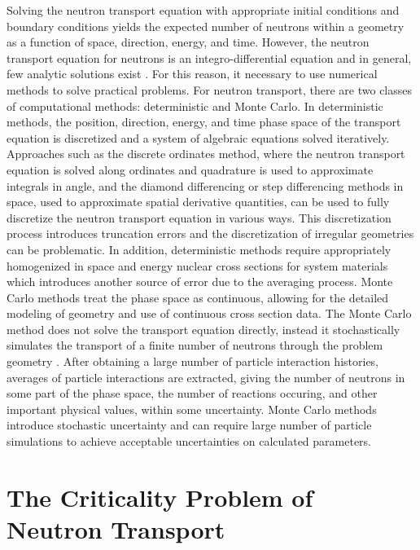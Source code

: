 Solving the neutron transport equation with appropriate initial conditions and boundary conditions yields the expected number of neutrons within a geometry as a function of space, direction, energy, and time. However, the neutron transport equation for neutrons is an integro-differential equation and in general, few analytic solutions exist \cite{lewis_computational_1984}. For this reason, it necessary to use numerical methods to solve practical problems. For neutron transport, there are two classes of computational methods: deterministic and Monte Carlo. In deterministic methods, the position, direction, energy, and time phase space of the transport equation is discretized and a system of algebraic equations solved iteratively. Approaches such as the discrete ordinates method, where the neutron transport equation is solved along ordinates and quadrature is used to approximate integrals in angle, and the diamond differencing or step differencing methods in space, used to approximate spatial derivative quantities, can be used to fully discretize the neutron transport equation in various ways. This discretization process introduces truncation errors and the discretization of irregular geometries can be problematic. In addition, deterministic methods require appropriately homogenized in space and energy nuclear cross sections for system materials which introduces another source of error due to the averaging process. Monte Carlo methods treat the phase space as continuous, allowing for the detailed modeling of geometry and use of continuous cross section data. The Monte Carlo method does not solve the transport equation directly, instead it stochastically simulates the transport of a finite number of neutrons through the problem geometry \cite{lux_monte_1991}. After obtaining a large number of particle interaction histories, averages of particle interactions are extracted, giving the number of neutrons in some part of the phase space, the number of reactions occuring, and other important physical values, within some uncertainty. Monte Carlo methods introduce stochastic uncertainty and can require large number of particle simulations to achieve acceptable uncertainties on calculated parameters.

\section{The Criticality Problem of Neutron Transport}

